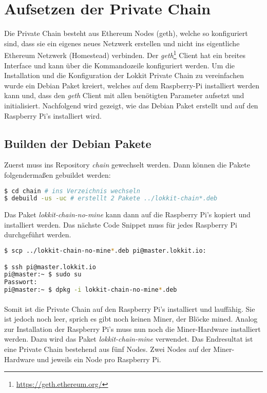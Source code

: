 \section{Aufsetzen der Private Chain}
Die Private Chain besteht aus Ethereum Nodes (geth), welche so konfiguriert sind, dass sie ein eigenes neues Netzwerk erstellen und nicht ins eigentliche Ethereum Netzwerk (Homestead) verbinden. Der \emph{geth}\footnote{\url{https://geth.ethereum.org/}} Client hat ein breites Interface und kann über die Kommandozeile konfiguriert werden. Um die Installation und die Konfiguration der Lokkit Private Chain zu vereinfachen wurde ein Debian Paket kreiert, welches auf dem Raspberry-Pi installiert werden kann und, dass den \emph{geth} Client mit allen benötigten Parameter aufsetzt und initialisiert. Nachfolgend wird gezeigt, wie das Debian Paket erstellt und auf den Raspberry Pi's installiert wird. 

\subsection{Builden der Debian Pakete}
Zuerst muss ins Repository \emph{chain} gewechselt werden. Dann können die Pakete folgendermaßen gebuildet werden:

\begin{lstlisting}[language=bash]
$ cd chain # ins Verzeichnis wechseln
$ debuild -us -uc # erstellt 2 Pakete ../lokkit-chain*.deb
\end{lstlisting}

Das Paket \emph{lokkit-chain-no-mine} kann dann auf die Raspberry Pi's kopiert und installiert werden. Das nächste Code Snippet muss für jedes Raspberry Pi durchgeführt werden.

\begin{lstlisting}[language=bash]
$ scp ../lokkit-chain-no-mine*.deb pi@master.lokkit.io:

$ ssh pi@master.lokkit.io
pi@master:~ $ sudo su
Passwort: 
pi@master:~ $ dpkg -i lokkit-chain-no-mine*.deb
\end{lstlisting}

\paragraph{}
Somit ist die Private Chain auf den Raspberry Pi's installiert und lauffähig. Sie ist jedoch noch leer, sprich es gibt noch keinen Miner, der Blöcke mined. Analog zur Installation der Raspberry Pi's muss nun noch die Miner-Hardware installiert werden. Dazu wird das Paket \emph{lokkit-chain-mine} verwendet. Das Endresultat ist eine Private Chain bestehend aus fünf Nodes. Zwei Nodes auf der Miner-Hardware und jeweils ein Node pro Raspberry Pi.

